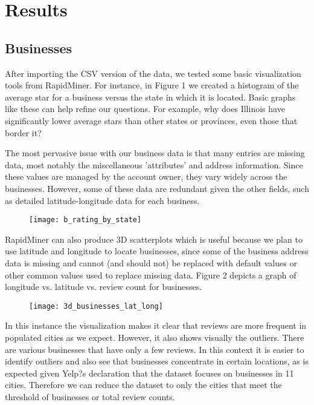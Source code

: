 \section{Results}

\subsection{Businesses}

After importing the CSV version of the data, we tested some basic visualization tools from RapidMiner. For instance, in Figure 1 we created a histogram of the average star for a business versus the state in which it is located. Basic graphs like these can help refine our questions. For example, why does Illinois have significantly lower average stars than other states or provinces, even those that border it? 

\quad The most pervasive issue with our business data is that many entries are missing data, most notably the miscellaneous 'attributes' and address information. Since these values are managed by the account owner, they vary widely across the businesses. However, some of these data are redundant given the other fields, such as detailed latitude-longitude data for each business.

\begin{figure}[h]
\texttt{[image: b\_rating\_by\_state]}
\end{figure}

RapidMiner can also produce 3D scatterplots which is useful because we plan to use latitude and longitude to locate businesses, since some of the business address data is missing and cannot (and should not) be replaced with default values or other common values used to replace missing data. Figure 2 depicts a graph of longitude vs. latitude vs. review count for businesses. 

\begin{figure}[!h]
\texttt{[image: 3d\_businesses\_lat\_long]}
\end{figure}

In this instance the visualization makes it clear that reviews are more frequent in populated cities as we expect. However, it also shows visually the outliers. There are various businesses that have only a few reviews. In this context it is easier to identify outliers and also see that businesses concentrate in certain locations, as is expected given Yelp?s declaration that the dataset focuses on businesses in 11 cities. Therefore we can reduce the dataset to only the cities that meet the threshold of businesses or total review counts. 

